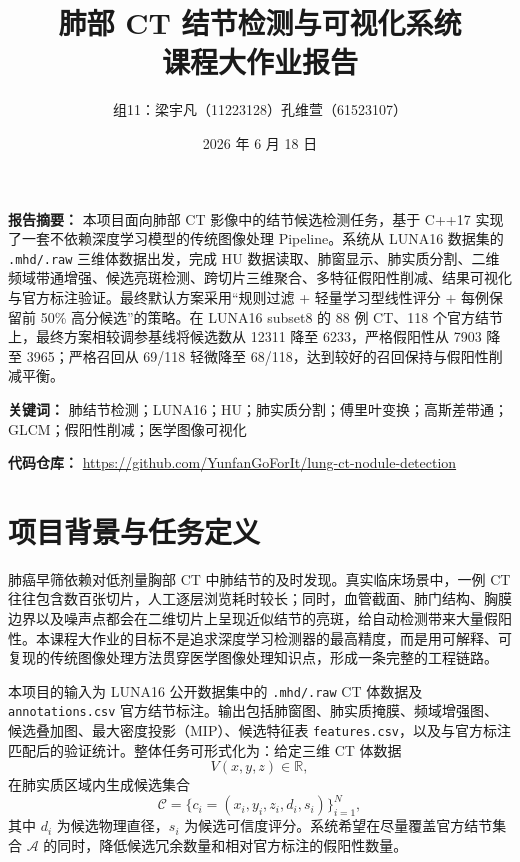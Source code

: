 \documentclass[UTF8,zihao=-4,fontset=none]{ctexart}
\title{\bfseries 肺部 CT 结节检测与可视化系统\\课程大作业报告}
\author{组11：梁宇凡（11223128）\quad 孔维萱（61523107）}
\date{2026 年 6 月 18 日}
\newcommand{\code}[1]{\texttt{#1}}
\begin{document}
\maketitle
\thispagestyle{empty}

\begin{summarybox}
\textbf{报告摘要：}
本项目面向肺部 CT 影像中的结节候选检测任务，基于 C++17 实现了一套不依赖深度学习模型的传统图像处理 Pipeline。系统从 LUNA16 数据集的 \code{.mhd/.raw} 三维体数据出发，完成 HU 数据读取、肺窗显示、肺实质分割、二维频域带通增强、候选亮斑检测、跨切片三维聚合、多特征假阳性削减、结果可视化与官方标注验证。最终默认方案采用“规则过滤 + 轻量学习型线性评分 + 每例保留前 50\% 高分候选”的策略。在 LUNA16 subset8 的 88 例 CT、118 个官方结节上，最终方案相较调参基线将候选数从 12311 降至 6233，严格假阳性从 7903 降至 3965；严格召回从 69/118 轻微降至 68/118，达到较好的召回保持与假阳性削减平衡。
\end{summarybox}

\vspace{1em}
\noindent\textbf{关键词：} 肺结节检测；LUNA16；HU；肺实质分割；傅里叶变换；高斯差带通；GLCM；假阳性削减；医学图像可视化

\vspace{0.5em}
\noindent\textbf{代码仓库：} \url{https://github.com/YunfanGoForIt/lung-ct-nodule-detection}

\newpage
\tableofcontents
\newpage

\section{项目背景与任务定义}

肺癌早筛依赖对低剂量胸部 CT 中肺结节的及时发现。真实临床场景中，一例 CT 往往包含数百张切片，人工逐层浏览耗时较长；同时，血管截面、肺门结构、胸膜边界以及噪声点都会在二维切片上呈现近似结节的亮斑，给自动检测带来大量假阳性。本课程大作业的目标不是追求深度学习检测器的最高精度，而是用可解释、可复现的传统图像处理方法贯穿医学图像处理知识点，形成一条完整的工程链路。

本项目的输入为 LUNA16 公开数据集中的 \code{.mhd/.raw} CT 体数据及 \code{annotations.csv} 官方结节标注。输出包括肺窗图、肺实质掩膜、频域增强图、候选叠加图、最大密度投影（MIP）、候选特征表 \code{features.csv}，以及与官方标注匹配后的验证统计。整体任务可形式化为：给定三维 CT 体数据
\[
V(x,y,z)\in \mathbb{R},
\]
在肺实质区域内生成候选集合
\[
\mathcal{C}=\{c_i=(x_i,y_i,z_i,d_i,s_i)\}_{i=1}^{N},
\]
其中 \(d_i\) 为候选物理直径，\(s_i\) 为候选可信度评分。系统希望在尽量覆盖官方结节集合 \(\mathcal{A}\) 的同时，降低候选冗余数量和相对官方标注的假阳性数量。
\end{document}
